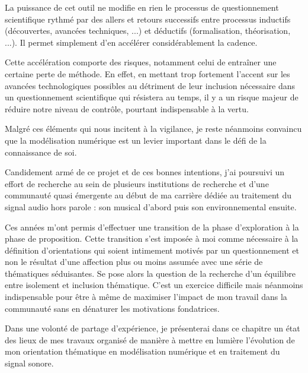 La puissance de cet outil ne modifie en rien le processus de questionnement scientifique rythmé par des allers et retours successifs entre processus inductifs (découvertes, avancées techniques, ...) et déductifs (formalisation, théorisation, ...). Il permet simplement d'en accélérer considérablement la cadence.

Cette accélération comporte des risques, notamment celui de entraîner une certaine perte de méthode. En effet, en mettant trop fortement l'accent sur les avancées technologiques possibles au détriment de leur inclusion nécessaire dans un questionnement scientifique qui résistera au temps, il y a un risque majeur de réduire notre niveau de contrôle, pourtant indispensable à la vertu.


Malgré ces éléments qui nous incitent à la vigilance, je reste néanmoins convaincu que la modélisation numérique est un levier important dans le défi de la connaissance de soi.

Candidement armé de ce projet et de ces bonnes intentions, j'ai poursuivi un effort de recherche au sein de plusieurs institutions de recherche et d'une communauté quasi émergente au début de ma carrière dédiée au traitement du signal audio \og hors parole \fg : son musical d'abord puis son environnemental ensuite. %

Ces années m'ont permis d'effectuer une transition de la phase d'exploration à la phase de proposition. Cette transition s'est imposée à moi comme nécessaire à la définition d'orientations qui soient intimement motivés par un questionnement et non le résultat d'une affection plus ou moins assumée avec une série de thématiques séduisantes. Se pose alors la question de la recherche d'un équilibre entre isolement et inclusion thématique. C'est un exercice difficile mais néanmoins indispensable pour être à même de maximiser l'impact de mon travail dans la communauté sans en dénaturer les motivations fondatrices.

Dans une volonté de partage d'expérience, je présenterai dans ce chapitre un état des lieux de mes travaux organisé de manière à mettre en lumière l'évolution de mon orientation thématique en modélisation numérique et en traitement du signal sonore.

